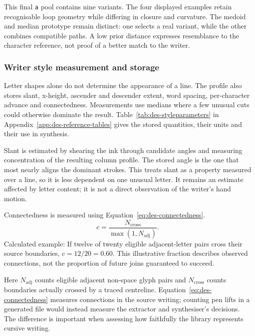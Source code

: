 This final \texttt{a} pool contains nine variants. The four displayed examples retain recognisable loop geometry while differing in closure and curvature. The medoid and median prototype remain distinct: one selects a real variant, while the other combines compatible paths. A low prior distance expresses resemblance to the character reference, not proof of a better match to the writer.~\cite[style.py; synthesise.py]{braunepipeline2026}


\subsubsection{Writer style measurement and storage}
\label{sec:des-profile}
Letter shapes alone do not determine the appearance of a line. The profile also stores slant, x-height, ascender and descender extent, word spacing, per-character advance and connectedness. Measurements use medians where a few unusual cuts could otherwise dominate the result. Table~\ref{tab:des-styleparameters} in Appendix~\ref{app:des-reference-tables} gives the stored quantities, their units and their use in synthesis.

Slant is estimated by shearing the ink through candidate angles and measuring concentration of the resulting column profile. The stored angle is the one that most nearly aligns the dominant strokes. This treats slant as a property measured over a line, so it is less dependent on one unusual letter. It remains an estimate affected by letter content; it is not a direct observation of the writer's hand motion.~\cite[style.py; synthesise.py; reproduce.py]{braunepipeline2026}

Connectedness is measured using Equation~\ref{eq:des-connectedness}.
\begin{equation}
c=\frac{N_{\mathrm{cross}}}{\max(1,N_{\mathrm{adj}})}.
\label{eq:des-connectedness}
\end{equation}
Calculated example: If twelve of twenty eligible adjacent-letter pairs cross their source boundaries, $c=12/20=0.60$. This illustrative fraction describes observed connections, not the proportion of future joins guaranteed to succeed. \cite[style.py, BuildAuthorProfile]{braunepipeline2026}

Here $N_{\mathrm{adj}}$ counts eligible adjacent non-space glyph pairs and $N_{\mathrm{cross}}$ counts boundaries actually crossed by a traced centreline. Equation~\ref{eq:des-connectedness} measures connections in the source writing; counting pen lifts in a generated file would instead measure the extractor and synthesiser's decisions. The difference is important when assessing how faithfully the library represents cursive writing.~\cite[style.py; synthesise.py; reproduce.py]{braunepipeline2026}

